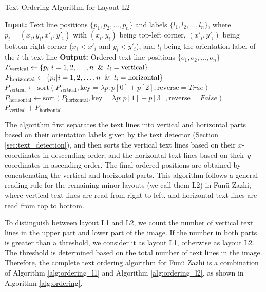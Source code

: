 \documentclass[12pt,twoside]{report}
\begin{document}
\begin{algorithm}[htbp]
    \caption{Text Ordering Algorithm for Layout L2}
    \begin{algorithmic}[1]
        \State \textbf{Input:} Text line positions $\{p_1, p_2, \ldots, p_n\}$ and labels $\{l_1, l_2, \ldots, l_n\}$, where $p_i = (x_i, y_i, x'_i, y'_i)$ with $(x_i, y_i)$ being top-left corner, $(x'_i, y'_i)$ being bottom-right corner ($x_i < x'_i$ and $y_i < y'_i$), and $l_i$ being the orientation label of the $i$-th text line
        \State \textbf{Output:} Ordered text line positions $\{o_1, o_2, \ldots, o_n\}$
            \State $P_{\text{vertical}} \gets \{p_i | i = 1, 2, \ldots, n \And l_i = \text{vertical}\}$
            \State $P_{\text{horizontal}} \gets \{p_i | i = 1, 2, \ldots, n \And l_i = \text{horizontal}\}$
            \State $P_{\text{vertical}} \gets \text{sort}(P_{\text{vertical}}, \text{key}=\lambda p: p[0] + p[2], \text{reverse}=True)$
            \State $P_{\text{horizontal}} \gets \text{sort}(P_{\text{horizontal}}, \text{key}=\lambda p: p[1] + p[3], \text{reverse}=False)$
            \State \Return $P_{\text{vertical}} + P_{\text{horizontal}}$
        \EndFunction
    \end{algorithmic}
    \label{alg:ordering_l2}
\end{algorithm}

The algorithm first separates the text lines into vertical and horizontal parts based on their orientation labels given by the text detector (Section \ref{sec:text_detection}), and then sorts the vertical text lines based on their $x$-coordinates in descending order, and the horizontal text lines based on their $y$-coordinates in ascending order. The final ordered positions are obtained by concatenating the vertical and horizontal parts. This algorithm follows a general reading rule for the remaining minor layouts (we call them L2) in Funü Zazhi, where vertical text lines are read from right to left, and horizontal text lines are read from top to bottom.

To distinguish between layout L1 and L2, we count the number of vertical text lines in the upper part and lower part of the image. If the number in both parts is greater than a threshold, we consider it as layout L1, otherwise as layout L2. The threshold is determined based on the total number of text lines in the image. Therefore, the complete text ordering algorithm for Funü Zazhi is a combination of Algorithm \ref{alg:ordering_l1} and Algorithm \ref{alg:ordering_l2}, as shown in Algorithm \ref{alg:ordering}.
\end{document}
